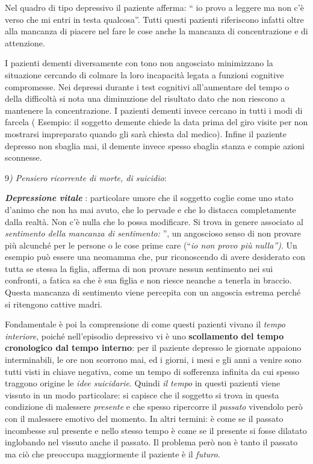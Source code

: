 \documentclass[]{article}
\begin{document}
Nel quadro di tipo depressivo il paziente afferma: `` io provo a leggere
ma non c'è verso che mi entri in testa qualcosa''. Tutti questi pazienti
riferiscono infatti oltre alla mancanza di piacere nel fare le cose
anche la mancanza di concentrazione e di attenzione.

I pazienti dementi diversamente con tono non angosciato minimizzano la
situazione cercando di colmare la loro incapacità legata a funzioni
cognitive compromesse. Nei depressi durante i test cognitivi
all'aumentare del tempo o della difficoltà si nota una diminuzione del
risultato dato che non riescono a mantenere la concentrazione. I
pazienti dementi invece cercano in tutti i modi di farcela ( Esempio: il
soggetto demente chiede la data prima del giro visite per non mostrarsi
impreparato quando gli sarà chiesta dal medico). Infine il paziente
depresso non sbaglia mai, il demente invece spesso sbaglia stanza e
compie azioni sconnesse.

9\emph{) Pensiero ricorrente di morte, di suicidio}:

\textbf{\emph{Depressione vitale}} : particolare umore che il soggetto
coglie come uno stato d'animo che non ha mai avuto, che lo pervade e che
lo distacca completamente dalla realtà. Non c'è nulla che lo possa
modificare. Si trova in genere associato al \emph{sentimento della
mancanza di sentimento:} '', un angoscioso senso di non provare più
alcunché per le persone o le cose prime care (``\emph{io non provo più
nulla'')}. Un esempio può essere una neomamma che, pur riconoscendo di
avere desiderato con tutta se stessa la figlia, afferma di non provare
nessun sentimento nei sui confronti, a fatica sa che è sua figlia e non
riesce neanche a tenerla in braccio. Questa mancanza di sentimento viene
percepita con un angoscia estrema perché si ritengono cattive madri.

Fondamentale è poi la comprensione di come questi pazienti vivano il
\emph{tempo interiore}, poiché nell'episodio depressivo vi è uno
\textbf{scollamento del tempo cronologico dal tempo interno}: per il
paziente depresso le giornate appaiono interminabili, le ore non
scorrono mai, ed i giorni, i mesi e gli anni a venire sono tutti visti
in chiave negativa, come un tempo di sofferenza infinita da cui spesso
traggono origine le \emph{idee suicidarie}. Quindi \emph{il tempo} in
questi pazienti viene vissuto in un modo particolare: si capisce che il
soggetto si trova in questa condizione di malessere \emph{presente} e
che spesso ripercorre il \emph{passato} vivendolo però con il malessere
emotivo del momento. In altri termini: è come se il passato incombesse
sul presente e nello stesso tempo è come se il presente si fosse
dilatato inglobando nel vissuto anche il passato. Il problema però non è
tanto il passato ma ciò che preoccupa maggiormente il paziente è il
\emph{futuro}.
\end{document}
